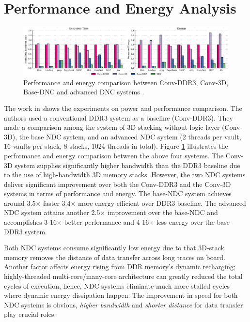 \documentclass[letterpaper, 11pt, conference, margin=1in]{ieeeconf}   %
\begin{document}
\section{Performance and Energy Analysis}
\begin{figure}[h]
    \centering
    \includegraphics[width=\textwidth, scale=0.5]{figures/comparison_performance_energy.png}
    \caption{Performance and energy comparison between Conv-DDR3, Conv-3D, Base-DNC and advanced DNC systems \cite{Gao2015}.}
    \label{fig:comp-power-energy}
\end{figure}
The work in \cite{Gao2015} shows the experiments on power and performance comparison. The authors used a conventional DDR3 system as a baseline (Conv-DDR3). They made a comparison among the system of 3D stacking without logic layer (Conv-3D), the base NDC system, and an advanced NDC system (2 threads per vault, 16 vaults per stack, 8 stacks, 1024 threads in total). Figure \ref{fig:comp-power-energy} illustrates the performance and energy comparison between the above four systems. The Conv-3D system supplies significantly higher bandwidth than the DDR3 baseline due to the use of high-bandwidth 3D memory stacks. However, the two NDC systems deliver significant improvement over both the Conv-DDR3 and the Conv-3D systems in terms of performance and energy. The base-NDC system achieves around 3.5$\times$ faster 3.4$\times$ more energy efficient over DDR3 baseline. The advanced NDC system attains another 2.5$\times$ improvement over the base-NDC and accomplishes 3-16$\times$ better performance and 4-16$\times$ less energy over the base-DDR3 system.

Both NDC systems consume significantly low energy due to that 3D-stack memory removes the distance of data transfer across long traces on board. Another factor affects energy rising from DDR memory's dynamic recharging; highly-threaded multi-core/many-core architecture can greatly reduced the total cycles of execution, hence, NDC systems eliminate much more stalled cycles where dynamic energy dissipation happen. The improvement in speed for both NDC systems is obvious, \textit{higher bandwidth} and \textit{shorter distance} for data transfer play crucial roles.
\end{document}
